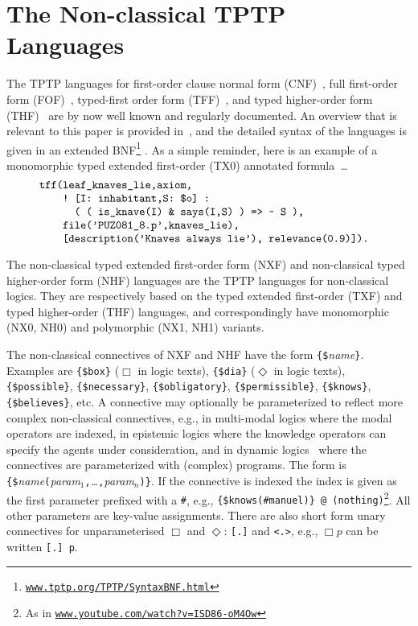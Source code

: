 \documentclass{ceurart}
\begin{document}
\section{The Non-classical TPTP Languages}
\label{TPTPLanguages}

The TPTP languages for first-order clause normal form (CNF)~\cite{SS98-JAR}, full first-order 
form (FOF)~\cite{Sut09}, typed-first order form (TFF)~\cite{SS+12,BP13-TFF1}, and typed 
higher-order form (THF)~\cite{SB10,KSR16} are by now well known and regularly documented.
An overview that is relevant to this paper is provided in~\cite{SF+22}, and the detailed
syntax of the languages is given in an extended BNF\footnote{%
\label{BNF}\href{https://www.tptp.org/TPTP/SyntaxBNF.html}{\tt www.tptp.org/TPTP/SyntaxBNF.html}} 
\cite{VS06}.
As a simple reminder, here is an example of a monomorphic typed extended first-order (TX0) 
annotated formula~\ldots
\[
\begin{minipage}{\textwidth}
\begin{verbatim}
    tff(leaf_knaves_lie,axiom,
        ! [I: inhabitant,S: $o] : 
          ( ( is_knave(I) & says(I,S) ) => ~ S ),
        file('PUZ081_8.p',knaves_lie),
        [description('Knaves always lie'), relevance(0.9)]).
\end{verbatim}
\end{minipage}
\]

The non-classical typed extended first-order form (NXF) and non-classical typed higher-order 
form (NHF) languages are the TPTP languages for non-classical logics.
They are respectively based on the typed extended first-order (TXF) and typed higher-order (THF)
languages, and correspondingly have mono\-morphic (NX0, NH0) and polymorphic (NX1, NH1) variants.

The non-classical connectives of NXF and NHF have the form {\tt \{\$}{\em name}{\tt \}}.
Examples are {\tt \{\$box\}} ($\Box$ in logic texts), {\tt \{\$dia\}} ($\Diamond$ in logic texts), 
{\tt \{\$possible\}}, {\tt \{\$necessary\}}, {\tt \{\$obligatory\}}, {\tt \{\$permissible\}}, 
{\tt \{\$knows\}}, {\tt \{\$believes\}}, etc.
A connective may optionally be parameterized to reflect more complex non-classical connectives,
e.g., in multi-modal logics where the modal operators are indexed, in epistemic logics
where the knowledge operators can specify the agents under consideration,
and in dynamic logics~\cite{HKT00} where the connectives are parameterized with (complex) programs.
The form is
{\tt \verb|{|\$}{\em name}{\tt (}{\em param$_1$}{\tt ,}{\em \ldots}{\tt ,}{\em param$_n$}{\tt )}{\tt \verb|}|}.
If the connective is indexed the index is given as the first parameter prefixed with a {\tt \#},
e.g., {\tt \{\$knows(\#manuel)\} @ (nothing)}\footnote{%
As in \href{https://www.youtube.com/watch?v=ISD86-oM4Ow}{\tt www.youtube.com/watch?v=ISD86-oM4Ow}}.
All other parameters are key-value assignments.
There are also short form unary connectives for unparameterised $\Box$ and $\Diamond$: {\tt [.]} 
and {\tt <.>}, e.g., $\Box p$ can be written {\tt [.] p}.
\end{document}

